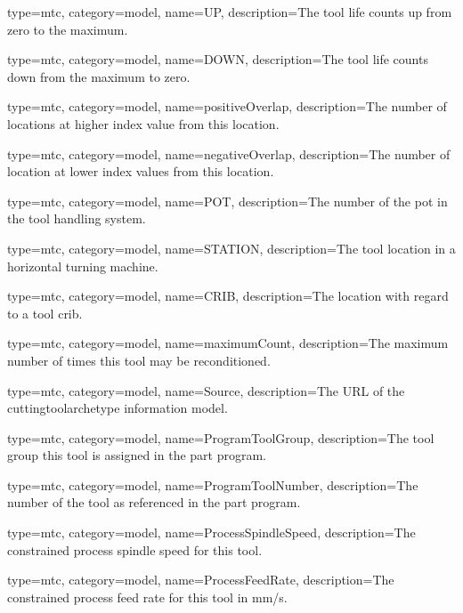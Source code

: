 {
  type=mtc,
  category=model,
  name={UP},
  description={The tool life counts up from zero to the maximum.}
}


{
  type=mtc,
  category=model,
  name={DOWN},
  description={The tool life counts down from the maximum to zero.}
}


{
  type=mtc,
  category=model,
  name={positiveOverlap},
  description={The number of locations at higher index value from this location.}
}


{
  type=mtc,
  category=model,
  name={negativeOverlap},
  description={The number of location at lower index values from this location.}
}


{
  type=mtc,
  category=model,
  name={POT},
  description={The number of the pot in the tool handling system.}
}


{
  type=mtc,
  category=model,
  name={STATION},
  description={The tool location in a horizontal turning machine.}
}


{
  type=mtc,
  category=model,
  name={CRIB},
  description={The location with regard to a tool crib.}
}


{
  type=mtc,
  category=model,
  name={maximumCount},
  description={The maximum number of times this tool may be reconditioned.}
}


{
  type=mtc,
  category=model,
  name={Source},
  description={The URL of the \gls{cuttingtoolarchetype} \gls{information model}.}
}


{
  type=mtc,
  category=model,
  name={ProgramToolGroup},
  description={The tool group this tool is assigned in the part program.}
}


{
  type=mtc,
  category=model,
  name={ProgramToolNumber},
  description={The number of the tool as referenced in the part program.}
}


{
  type=mtc,
  category=model,
  name={ProcessSpindleSpeed},
  description={The constrained process spindle speed for this tool.}
}


{
  type=mtc,
  category=model,
  name={ProcessFeedRate},
  description={The constrained process feed rate for this tool in mm/s.}
}


